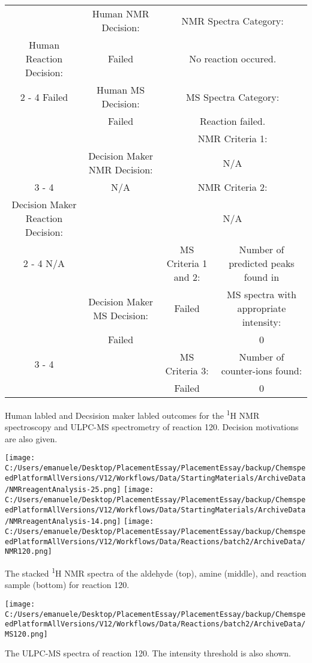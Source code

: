 \documentclass{article}%
\begin{document}
\begin{Decision Table}[H]%
\begin{tabular}{|c|c|c|c|}%
\hline%
&Human NMR Decision:&\multicolumn{2}{|c|}{NMR Spectra Category:}\\%
Human Reaction Decision:&Failed&\multicolumn{2}{|c|}{No reaction occured.}\\%
\cline{2%
-%
4}%
Failed&Human MS Decision:&\multicolumn{2}{|c|}{MS Spectra Category:}\\%
&Failed&\multicolumn{2}{|c|}{Reaction failed.}\\%
\hline%
&&\multicolumn{2}{|c|}{NMR Criteria 1:}\\%
&Decision Maker NMR Decision:&\multicolumn{2}{|c|}{N/A}\\%
\cline{3%
-%
4}%
&N/A&\multicolumn{2}{|c|}{NMR Criteria 2:}\\%
Decision Maker Reaction Decision:&&\multicolumn{2}{|c|}{N/A}\\%
\cline{2%
-%
4}%
N/A&&MS Criteria 1 and 2:&Number of predicted peaks found in\\%
&Decision Maker MS Decision:&Failed&MS spectra with appropriate intensity:\\%
&Failed&&0\\%
\cline{3%
-%
4}%
&&MS Criteria 3:&Number of counter{-}ions found:\\%
&&Failed&0\\%
\hline%
\end{tabular}%
\caption{Human labled and Decsision maker labled outcomes for the \textsuperscript{1}H NMR spectroscopy and ULPC-MS spectrometry of reaction 120. Decision motivations are also given.}%
\end{Decision Table}%
\begin{NMR Spectra}[H]%
\begin{center}%
\texttt{[image: C:/Users/emanuele/Desktop/PlacementEssay/PlacementEssay/backup/ChemspeedPlatformAllVersions/V12/Workflows/Data/StartingMaterials/ArchiveData/NMRreagentAnalysis-25.png]}\hfill%
\texttt{[image: C:/Users/emanuele/Desktop/PlacementEssay/PlacementEssay/backup/ChemspeedPlatformAllVersions/V12/Workflows/Data/StartingMaterials/ArchiveData/NMRreagentAnalysis-14.png]}\hfill%
\texttt{[image: C:/Users/emanuele/Desktop/PlacementEssay/PlacementEssay/backup/ChemspeedPlatformAllVersions/V12/Workflows/Data/Reactions/batch2/ArchiveData/NMR120.png]}\hfill%
\end{center}%
\caption{The stacked \textsuperscript{1}H NMR spectra of the aldehyde (top), amine (middle), and reaction sample (bottom) for reaction 120.}%
\end{NMR Spectra}%
\begin{MS Spectra}[H]%
\begin{center}%
\texttt{[image: C:/Users/emanuele/Desktop/PlacementEssay/PlacementEssay/backup/ChemspeedPlatformAllVersions/V12/Workflows/Data/Reactions/batch2/ArchiveData/MS120.png]}\hfill%
\end{center}%
\caption{The ULPC-MS spectra of reaction 120. The intensity threshold is also shown.}%
\end{MS Spectra}%
\end{document}
